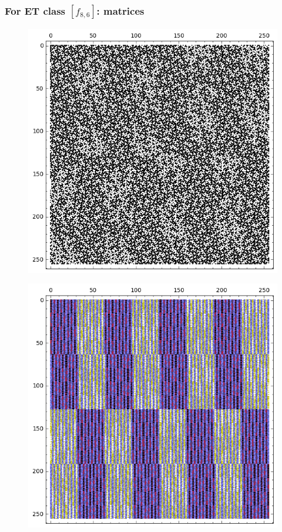 \documentclass[pdf,sprung,slideColor,nocolorBG]{beamer}
\newenvironment{colortheme}[1]{
\def\ProvidesPackageRCS $##1${\relax}
\renewcommand{\ProcessOptions}{\relax}
\makeatletter

\makeatother
}{}
\begin{document}
\begin{colortheme}{jubata}
\begin{frame}
\begin{figure}
\begin{minipage}{.48\textwidth}
  \label{fig:8_5_bent_cayley_graph_index_matrix}
\end{minipage}
\end{figure}
~
\end{frame}
\begin{frame}
\frametitle{For ET class $[f_{8,6}]$: matrices}
\begin{figure}
\centering
\begin{minipage}{.48\textwidth}
  \centering
  \includegraphics[width=.9\linewidth]{../matrix_plot/c8_6_weight_class_matrix.png}
  \label{fig:8_6_weight_class_matrix}
\end{minipage}%
\begin{minipage}{.48\textwidth}
  \centering
  \includegraphics[width=.9\linewidth]{../matrix_plot/c8_6_bent_cayley_graph_index_matrix.png}

\end{minipage}
\end{figure}
\end{frame}
\end{colortheme}
\end{document}
